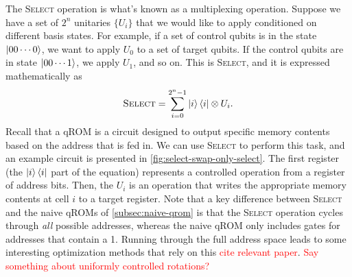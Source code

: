 \documentclass[a4paper,12pt]{article}
\newcommand\todo[1]{\textcolor{red}{#1}}
\begin{document}
The \textsc{Select} operation is what's known as a multiplexing operation.
Suppose we have a set of $2^n$ unitaries $\{U_i\}$ that we would like to apply conditioned on different basis states.
For example, if a set of control qubits is in the state $\ket{00\cdots0}$, we want to apply $U_0$ to a set of target qubits.
If the control qubits are in state $\ket{00\cdots1}$, we apply $U_1$, and so on.
This is \textsc{Select}, and it is expressed mathematically as 
\begin{equation}
 \textsc{Select} = \sum_{i=0}^{2^n - 1} \ket{i}\bra{i} \otimes U_i.
\end{equation}
Recall that a qROM is a circuit designed to output specific memory contents based on the address that is fed in.
We can use \textsc{Select} to perform this task, and an example circuit is presented in \autoref{fig:select-swap-only-select}.
The first register (the $\ket{i} \bra{i}$ part of the equation) represents a controlled operation from a register of address bits.
Then, the $U_i$ is an operation that writes the appropriate memory contents at cell $i$ to a target register. 
Note that a key difference between \textsc{Select} and the naive qROMs of \autoref{subsec:naive-qrom} is that the \textsc{Select} operation cycles through \emph{all} possible addresses, whereas the naive qROM only includes gates for addresses that contain a 1.
Running through the full address space leads to some interesting optimization methods that rely on this \todo{cite relevant paper}.
\todo{Say something about uniformly controlled rotations?}
\end{document}
